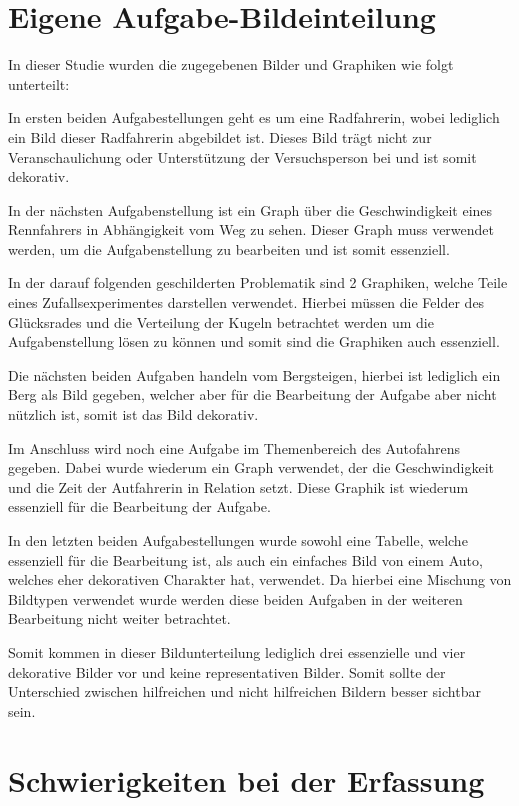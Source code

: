 \section{Eigene Aufgabe-Bildeinteilung}

In dieser Studie wurden die zugegebenen Bilder und Graphiken wie folgt unterteilt:

In ersten beiden Aufgabestellungen geht es um eine Radfahrerin, wobei lediglich ein Bild dieser Radfahrerin abgebildet ist. Dieses Bild trägt nicht zur Veranschaulichung oder Unterstützung der Versuchsperson bei und ist somit dekorativ. 


In der nächsten Aufgabenstellung ist ein Graph über die Geschwindigkeit eines Rennfahrers in Abhängigkeit vom Weg zu sehen. Dieser Graph muss verwendet werden, um die Aufgabenstellung zu bearbeiten und ist somit essenziell. 


In der darauf folgenden geschilderten Problematik sind 2 Graphiken, welche Teile eines Zufallsexperimentes darstellen verwendet. Hierbei müssen die Felder des Glücksrades und die Verteilung der Kugeln betrachtet werden um die Aufgabenstellung lösen zu können und somit sind die Graphiken auch essenziell.


Die nächsten beiden Aufgaben handeln vom Bergsteigen, hierbei ist lediglich ein Berg als Bild gegeben, welcher aber für die Bearbeitung der Aufgabe aber nicht nützlich ist, somit ist das Bild dekorativ. 


Im Anschluss wird noch eine Aufgabe im Themenbereich des Autofahrens gegeben. Dabei wurde wiederum ein Graph verwendet, der die Geschwindigkeit und die Zeit der Autfahrerin in Relation setzt. Diese Graphik ist wiederum essenziell für die Bearbeitung der Aufgabe. 


In den letzten beiden Aufgabestellungen wurde sowohl eine Tabelle, welche essenziell für die Bearbeitung ist, als auch ein einfaches Bild von einem Auto, welches eher dekorativen Charakter hat, verwendet. Da hierbei eine Mischung von Bildtypen verwendet wurde werden diese beiden Aufgaben in der weiteren Bearbeitung nicht weiter betrachtet. 

Somit kommen in dieser Bildunterteilung lediglich drei essenzielle und vier dekorative Bilder vor und keine representativen Bilder. Somit sollte der Unterschied zwischen hilfreichen und nicht hilfreichen Bildern besser sichtbar sein.

\section{Schwierigkeiten bei der Erfassung}


